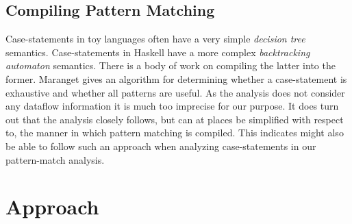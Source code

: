 \documentclass[a4paper]{report}
\begin{document}
%

\section{Compiling Pattern Matching}
Case-statements in toy languages often have a very simple \emph{decision tree} semantics. Case-statements in Haskell have a more complex \emph{backtracking automaton} semantics. There is a body of work on compiling the latter into the former. Maranget \cite{DBLP:journals/jfp/Maranget07} gives an algorithm for determining whether a case-statement is exhaustive and whether all patterns are useful. As the analysis does not consider any dataflow information it is much too imprecise for our purpose. It does turn out that the analysis closely follows, but can at places be simplified with respect to, the manner in which pattern matching is compiled. This indicates might also be able to follow such an approach when analyzing case-statements in our pattern-match analysis.

\chapter{Approach}\label{secapproach}
\end{document}

